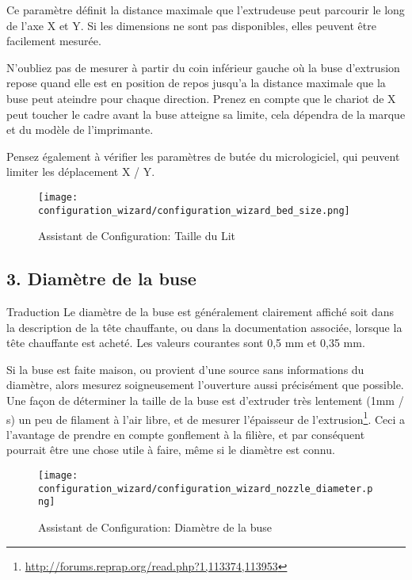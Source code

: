 Ce param\`etre d\'efinit la distance maximale que l'extrudeuse peut parcourir le long de l'axe X et Y. Si les dimensions ne sont pas disponibles, elles peuvent \^etre facilement mesur\'ee.

N'oubliez pas de mesurer \`a partir du coin inf\'erieur gauche o\`u la buse d'extrusion repose quand elle est en position de repos jusqu'a la distance maximale que la buse peut ateindre pour chaque direction. Prenez en compte que le chariot de X peut toucher le cadre avant la buse atteigne sa limite, cela d\'ependra de la marque et du mod\`ele de l'imprimante.

Pensez \'egalement \`a v\'erifier les param\`etres de but\'ee du micrologiciel, qui peuvent limiter les d\'eplacement X / Y.

\begin{figure}[H]
\centering
\texttt{[image: configuration\_wizard/configuration\_wizard\_bed\_size.png]}
\caption{Assistant de Configuration: Taille du Lit}
\label{fig:configuration_wizard_bed_size}
\end{figure}

\newpage
\subsection{3. Diam\`etre de la buse}
\label{sub:3_nozzle_diameter}
Traduction
Le diam\`etre de la buse est g\'en\'eralement clairement affich\'e soit dans la description de la t\^ete chauffante, ou dans la documentation associ\'ee, lorsque la t\^ete chauffante est achet\'e. Les valeurs courantes sont 0,5 mm et 0,35 mm.

Si la buse est faite maison, ou provient d'une source sans informations du diam\`etre, alors mesurez soigneusement l'ouverture aussi pr\'ecis\'ement que possible. Une fa\c{c}on de d\'eterminer la taille de la buse est d'extruder tr\`es lentement (1mm / s) un peu de filament \`a l'air libre, et de mesurer l'\'epaisseur de l'extrusion\footnote{\url{http://forums.reprap.org/read.php?1,113374,113953}}.  
Ceci a l'avantage de prendre en compte gonflement \`a la fili\`ere, et par cons\'equent pourrait \^etre une chose utile \`a faire, m\^eme si le diam\`etre est connu.

\begin{figure}[H]
\centering
\texttt{[image: configuration\_wizard/configuration\_wizard\_nozzle\_diameter.png]}
\caption{Assistant de Configuration: Diam\`etre de la buse}
\label{fig:configuration_wizard_nozzle_diameter}
\end{figure}

